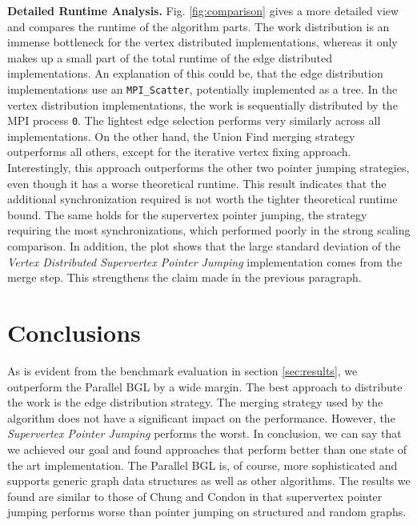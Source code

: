 \documentclass[letterpaper]{article}
\newcommand{\mypar}[1]{{\bf #1.}}
\begin{document}
\mypar{Detailed Runtime Analysis}
Fig. \ref{fig:comparison} gives a more detailed view and compares the runtime of the algorithm parts. The work
distribution is an immense bottleneck for the vertex distributed implementations, whereas it only makes up a small part
of the total runtime of the edge distributed implementations. An explanation of this could be, that the edge
distribution implementations use an \verb|MPI_Scatter|, potentially implemented as a tree. In the vertex distribution
implementations, the work is sequentially distributed by the MPI process \verb|0|. The lightest edge selection performs
very similarly across all implementations. On the other hand, the Union Find merging strategy outperforms all others,
except for the iterative vertex fixing approach. Interestingly, this approach outperforms the other two pointer jumping
strategies, even though it has a worse theoretical runtime. This result indicates that the additional synchronization
required is not worth the tighter theoretical runtime bound. The same holds for the supervertex pointer jumping, the
strategy requiring the most synchronizations, which performed poorly in the strong scaling comparison. In addition, the
plot shows that the large standard deviation of the \emph{Vertex Distributed Supervertex Pointer Jumping} implementation
comes from the merge step. This strengthens the claim made in the previous paragraph.

\section{Conclusions}
As is evident from the benchmark evaluation in section \ref{sec:results}, we outperform the Parallel BGL by a wide
margin. The best approach to distribute the work is the edge distribution strategy. The merging strategy used by the algorithm does not have a significant impact on
the performance. However, the \emph{Supervertex Pointer Jumping} performs the worst. In conclusion, we can say that we
achieved our goal and found approaches that perform better than one state of the art implementation. The Parallel BGL
is, of course, more sophisticated and supports generic graph data structures as well as other algorithms. The results we
found are similar to those of Chung and Condon \cite{chung1996parallel} in that supervertex pointer jumping performs
worse than pointer jumping on structured and random graphs.
\end{document}
